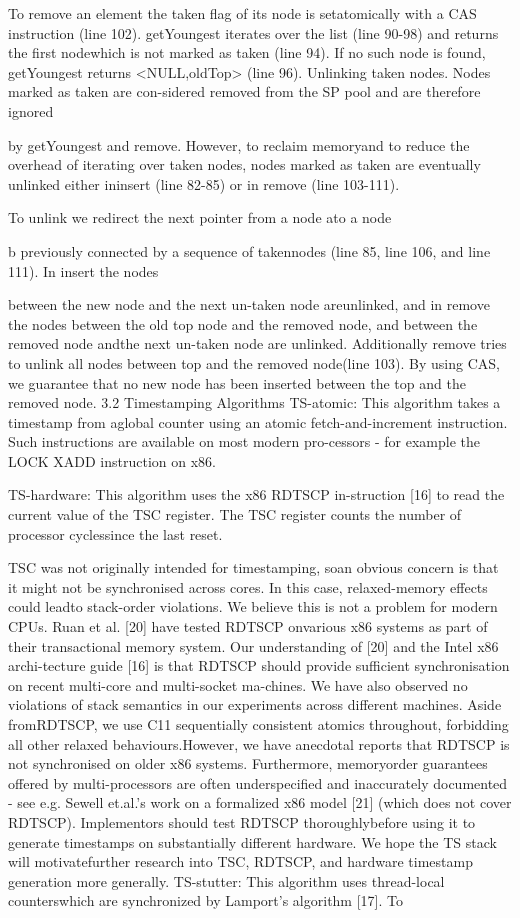 To remove an element the taken flag of its node is setatomically with a CAS instruction (line 102). getYoungest
iterates over the list (line 90-98) and returns the first nodewhich is not marked as taken (line 94). If no such node is
found, getYoungest returns <NULL,oldTop> (line 96).
Unlinking taken nodes. Nodes marked as taken are con-sidered removed from the SP pool and are therefore ignored

by getYoungest and remove. However, to reclaim memoryand to reduce the overhead of iterating over taken nodes,
nodes marked as taken are eventually unlinked either ininsert (line 82-85) or in remove (line 103-111).

To unlink we redirect the next pointer from a node ato a node

b previously connected by a sequence of takennodes (line 85, line 106, and line 111). In insert the nodes

between the new node and the next un-taken node areunlinked, and in remove the nodes between the old top node
and the removed node, and between the removed node andthe next un-taken node are unlinked. Additionally remove
tries to unlink all nodes between top and the removed node(line 103). By using CAS, we guarantee that no new node has
been inserted between the top and the removed node.
3.2 Timestamping Algorithms
TS-atomic: This algorithm takes a timestamp from aglobal counter using an atomic fetch-and-increment instruction. Such instructions are available on most modern pro-cessors - for example the LOCK XADD instruction on x86.

TS-hardware: This algorithm uses the x86 RDTSCP in-struction [16] to read the current value of the TSC register. The TSC register counts the number of processor cyclessince the last reset.

TSC was not originally intended for timestamping, soan obvious concern is that it might not be synchronised
across cores. In this case, relaxed-memory effects could leadto stack-order violations. We believe this is not a problem
for modern CPUs. Ruan et al. [20] have tested RDTSCP onvarious x86 systems as part of their transactional memory
system. Our understanding of [20] and the Intel x86 archi-tecture guide [16] is that RDTSCP should provide sufficient
synchronisation on recent multi-core and multi-socket ma-chines. We have also observed no violations of stack semantics in our experiments across different machines. Aside fromRDTSCP, we use C11 sequentially consistent atomics throughout, forbidding all other relaxed behaviours.However, we have anecdotal reports that RDTSCP is not
synchronised on older x86 systems. Furthermore, memoryorder guarantees offered by multi-processors are often underspecified and inaccurately documented - see e.g. Sewell et.al.'s work on a formalized x86 model [21] (which does not
cover RDTSCP). Implementors should test RDTSCP thoroughlybefore using it to generate timestamps on substantially
different hardware. We hope the TS stack will motivatefurther research into TSC, RDTSCP, and hardware timestamp
generation more generally.
TS-stutter: This algorithm uses thread-local counterswhich are synchronized by Lamport's algorithm [17]. To

